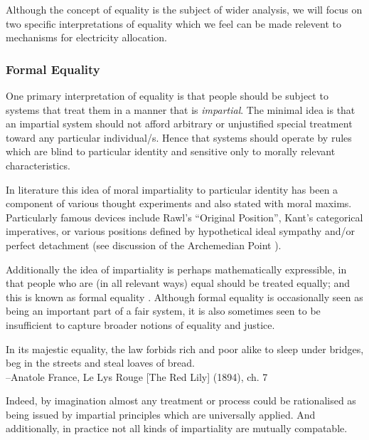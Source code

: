 Although the concept of equality is the subject of wider analysis, we will focus on two specific interpretations of equality which we feel can be made relevent to mechanisms for electricity allocation.

\subsubsection{Formal Equality}

One primary interpretation of equality is that people should be subject to systems that treat them in a manner that is \textit{impartial}. The minimal idea is that an impartial system should not afford arbitrary or unjustified special treatment toward any particular individual/s. Hence that systems should operate by rules which are blind to particular identity and sensitive only to morally relevant characteristics.

In literature this idea of moral impartiality to particular identity has been a component of various thought experiments and also stated with moral maxims.
Particularly famous devices include Rawl's ``Original Position'', Kant's categorical imperatives, or various positions defined by hypothetical ideal sympathy and/or perfect detachment (see discussion of the Archemedian Point \cite{nla.cat-vn197822}).

Additionally the idea of impartiality is perhaps mathematically expressible, in that people who are (in all relevant ways) equal should be treated equally; and this is known as formal equality \cite{whatisbasicequalitynathan}. Although formal equality is occasionally seen as being an important part of a fair system, it is also sometimes seen to be insufficient to capture broader notions of equality and justice.

\begin{displayquote}
In its majestic equality, the law forbids rich and poor alike to sleep under bridges, beg in the streets and steal loaves of bread.\\
--Anatole France, Le Lys Rouge [The Red Lily] (1894), ch. 7
\end{displayquote}

Indeed, by imagination almost any treatment or process could be rationalised as being issued by impartial principles which are universally applied. And additionally, in practice not all kinds of impartiality are mutually compatable.\cite{Hutchinson_2019}

